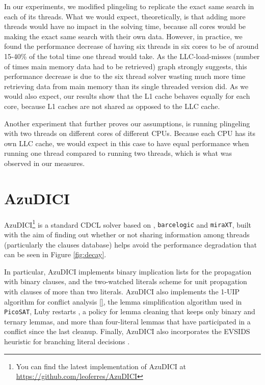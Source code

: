 \documentclass{llncs}
\begin{document}
In our experiments, we modified plingeling to replicate the exact same
search in each of its threads. What we would expect, theoretically, is
that adding more threads would have no impact in the solving time,
because all cores would be making the exact same search with their own
data. However, in practice, we found the performance decrease of
having six threads in six cores to be of around 15-40\% of the total
time one thread would take. As the LLC-load-misses (number of times
main memory data had to be retrieved) graph strongly suggests, this
performance decrease is due to the six thread solver wasting much more
time retrieving data from main memory than its single threaded version
did. As we would also expect, our results show that the L1 cache
behaves equally for each core, because L1 caches are not shared as
opposed to the LLC cache.

Another experiment that further proves our assumptions, is running
plingeling with two threads on different cores of different
CPUs. Because each CPU has its own LLC cache, we would expect in this
case to have equal performance when running one thread compared to
running two threads, which is what was observed in our measures.

\section{AzuDICI}
\label{sec:azudici}

AzuDICI\footnote{You can find the latest implementation of AzuDICI at
  \url{https://github.com/leoferres/AzuDICI}} is a standard CDCL
solver based on \pling, {\tt barcelogic} and {\tt miraXT}, built with
the aim of finding out whether or not sharing information among
threads (particularly the clauses database) helps avoid the
performance degradation that can be seen in Figure \ref{fig:decay}.

In particular, AzuDICI implements binary implication lists for the
propagation with binary clauses, and the two-watched literals scheme
for unit propagation \cite{} with clauses of more than two
literals. AzuDICI also implements the 1-UIP algorithm for conflict
analysis \ref{}, the lemma simplification algorithm used in {\tt
  PicoSAT}, Luby restarts \cite{}, a policy for lemma cleaning that
keeps only binary and ternary lemmas, and more than four-literal
lemmas that have participated in a conflict since the last
cleanup. Finally, AzuDICI also incorporates the EVSIDS heuristic for
branching literal decisions \cite{}.
\end{document}
